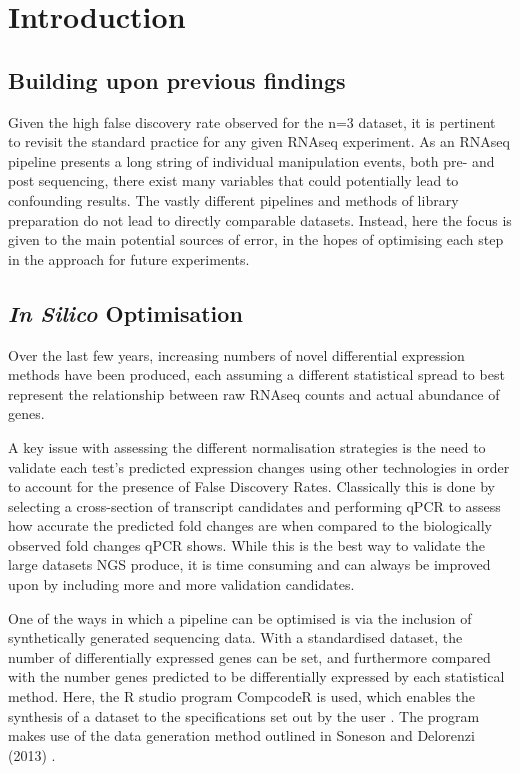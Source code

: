 \doublespacing
\section{Introduction}

\subsection{Building upon previous findings}

Given the high false discovery rate observed for the n=3 dataset, it is pertinent to revisit the standard practice for any given RNAseq experiment. As an RNAseq pipeline presents a long string of individual manipulation events, both pre- and post sequencing, there exist many variables that could potentially lead to confounding results. The vastly different pipelines and methods of library preparation do not lead to directly comparable datasets. Instead, here the focus is given to the main potential sources of error, in the hopes of optimising each step in the approach for future experiments. 

\subsection{\textit{In Silico} Optimisation}

Over the last few years, increasing numbers of novel differential expression methods have been produced, each assuming a different statistical spread to best represent the relationship between raw RNAseq counts and actual abundance of genes. 

A key issue with assessing the different normalisation strategies is the need to validate each test’s predicted expression changes using other technologies in order to account for the presence of False Discovery Rates. Classically this is done by selecting a cross-section of transcript candidates and performing qPCR to assess how accurate the predicted fold changes are when compared to the biologically observed fold changes qPCR shows. While this is the best way to validate the large datasets NGS produce, it is time consuming and can always be improved upon by including more and more validation candidates.  

One of the ways in which a pipeline can be optimised is via the inclusion of synthetically generated sequencing data. With a standardised dataset, the number of differentially expressed genes can be set, and furthermore compared with the number genes predicted to be differentially expressed by each statistical method. Here, the R studio program CompcodeR is used, which enables the synthesis of a dataset to the specifications set out by the user \cite{Soneson2014}. The program makes use of the data generation method outlined in Soneson and Delorenzi (2013) \cite{Soneson2013}. 

